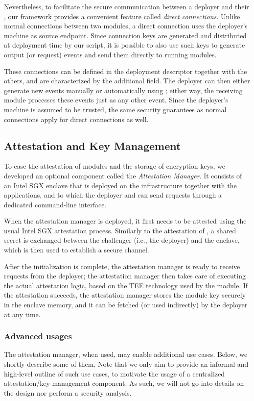 Nevertheless, to facilitate the secure communication between a deployer and
their \protmods, our framework provides a convenient feature called \emph{direct
connections}. Unlike normal connections between two modules, a direct connection
uses the deployer's machine as source endpoint. Since connection keys are
generated and distributed at deployment time by our script, it is possible to
also use such keys to generate output (or request) events and send them directly
to running modules.

These connections can be defined in the deployment descriptor together with the
others, and are characterized by the additional  field. The
deployer can then either generate new events manually or automatically using
\reactools; either way, the receiving module processes these events just as any
other event. Since the deployer's machine is assumed to be trusted, the same
security guarantees as normal connections apply for direct connections as well.

\subsection{Attestation and Key Management}
\label{impl:attestation}

To ease the attestation of modules and the storage of encryption keys, we
developed an optional component called the \emph{Attestation Manager}. It
consists of an Intel \ac{SGX} enclave that is deployed on the infrastructure
together with the applications, and to which the deployer and \reactools{} can
send requests through a dedicated command-line interface.

When the attestation manager is deployed, it first needs to be attested using
the usual Intel \ac{SGX} attestation process. Similarly to the attestation of
\protmods, a shared secret is exchanged between the challenger (i.e., the
deployer) and the enclave, which is then used to establish a secure channel.

After the initialization is complete, the attestation manager is ready to
receive \attest{} requests from the deployer; the attestation manager then takes
care of executing the actual attestation logic, based on the \ac{TEE} technology
used by the module. If the attestation succeeds, the attestation manager stores
the module key securely in the enclave memory, and it can be fetched (or used
indirectly) by the deployer at any time.

\subsubsection{Advanced usages} 
%
The attestation manager, when used, may enable additional use cases. Below, we
shortly describe some of them. Note that we only aim to provide an informal and
high-level outline of such use cases, to motivate the usage of a centralized
attestation/key management component. As such, we will not go into details on
the design nor perform a security analysis.


